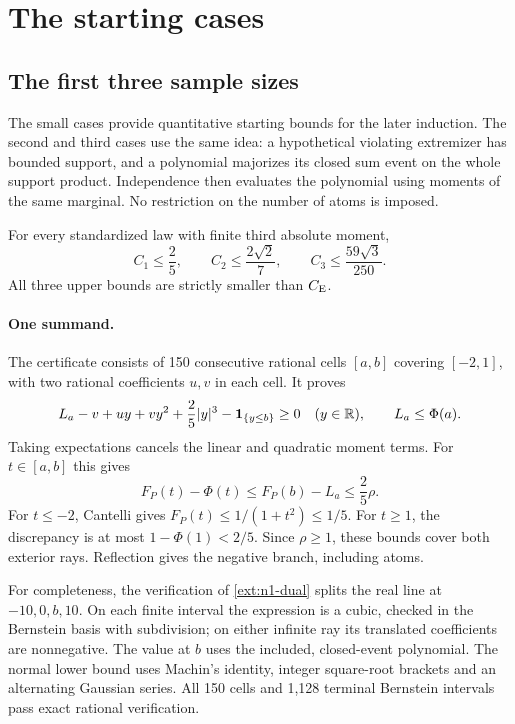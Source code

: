 \section{The starting cases}\label{ext:starting-cases}
\subsection{The first three sample sizes}
\label{ext:small-foundations}

The small cases provide quantitative starting bounds for the later
induction.  The second and third cases use the same idea: a hypothetical
violating extremizer has bounded support, and a polynomial majorizes its
closed sum event on the whole support product.  Independence then evaluates
the polynomial using moments of the same marginal.  No restriction on the
number of atoms is imposed.

\begin{theorem}\label{ext:n123}
For every standardized law with finite third absolute moment,
\[
 C_1\le\frac25,\qquad C_2\le\frac{2\sqrt2}{7},\qquad
 C_3\le\frac{59\sqrt3}{250}.
\]
All three upper bounds are strictly smaller than $C_{\mathrm E}$.
\end{theorem}

\paragraph{One summand.}
The certificate consists of 150 consecutive rational cells $[a,b]$
covering $[-2,1]$, with two rational coefficients $u,v$ in each cell.
It proves
\begin{equation}\label{ext:n1-dual}
 L_a-v+uy+vy^2+\frac25|y|^3-\mathbf 1_{\{y\le b\}}\ge0
 \quad(y\in\mathbb R),\qquad L_a\le\Phi(a).
\end{equation}
Taking expectations cancels the linear and quadratic moment terms.
For $t\in[a,b]$ this gives
\[
 F_P(t)-\Phi(t)\le F_P(b)-L_a\le\frac25\rho.
\]
For $t\le-2$, Cantelli gives $F_P(t)\le1/(1+t^2)\le1/5$.
For $t\ge1$, the discrepancy is at most $1-\Phi(1)<2/5$.
Since $\rho\ge1$, these bounds cover both exterior rays.
Reflection gives the negative branch, including atoms.

For completeness, the verification of \eqref{ext:n1-dual} splits the
real line at $-10,0,b,10$.  On each finite interval the expression is a
cubic, checked in the Bernstein basis with subdivision; on either
infinite ray its translated coefficients are nonnegative.  The value at
$b$ uses the included, closed-event polynomial.  The normal lower bound
uses Machin's identity, integer square-root brackets and an alternating
Gaussian series.  All 150 cells and 1,128 terminal Bernstein intervals
pass exact rational verification.

